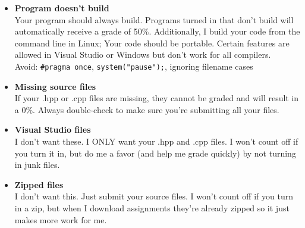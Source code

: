 \documentclass[a4paper,12pt,oneside]{book}
\begin{document}
                \begin{itemize}
                    \item   \textbf{Program doesn't build}
                        \\ Your program should always build. Programs turned in that don't build will automatically receive a grade of 50\%.{}
                            Additionally, I build your code from the command line in Linux; Your code should be portable. Certain features
                            are allowed in Visual Studio or Windows but don't work for all compilers. \\
                            \footnotesize Avoid: \texttt{\#pragma once}, \texttt{system("pause");}, ignoring filename cases
                            \normalsize 
                    \item   \textbf{Missing source files}
                        \\ If your .hpp or .cpp files are missing, they cannot be graded and will result in a 0\%. Always double-check to make sure you're submitting all your files.
                    \item   \textbf{Visual Studio files}
                        \\ I don't want these. I ONLY want your .hpp and .cpp files. I won't count off if you turn it in, but do me a favor (and help me grade quickly) by not turning in junk files.
                    \item   \textbf{Zipped files}
                        \\ I don't want this. Just submit your source files. I won't count off if you turn in a zip, but when I download assignments they're already zipped so it just makes more work for me.
                \end{itemize}

\renewcommand*\DTstylecomment{\rmfamily\color{green}\textsc}

\begin{framed}
\end{framed}
   
\end{document}
